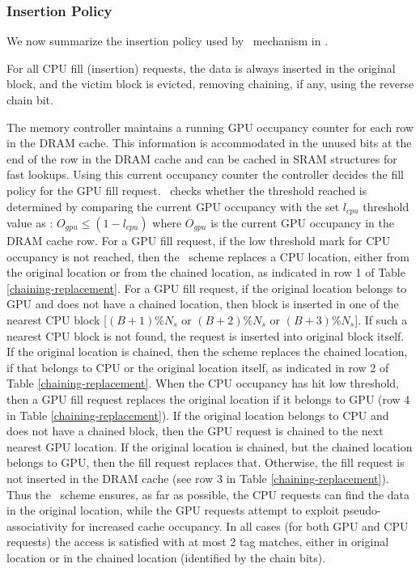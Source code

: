 \subsubsection{Insertion Policy}
\par We now summarize the insertion policy used by \chaining\ mechanism in \cachename. 
\par For all CPU fill (insertion) requests, the data is always inserted in the original block, and the victim block is evicted, removing chaining, if any, using the reverse chain bit. 
\par The memory controller maintains a running GPU occupancy counter for each row in the DRAM cache. This information is accommodated in the unused bits at the end of the row in the DRAM cache and can be cached in SRAM structures for fast lookups. Using this current occupancy counter the controller decides the fill policy for the GPU fill request. \cachename\ checks whether the threshold reached is determined by comparing the current GPU occupancy with the set \textit{$l_{cpu}$} threshold value as : $O_{gpu}\le(1-l_{cpu})$ where $O_{gpu}$ is the current GPU occupancy in the DRAM cache row. For a GPU fill request, if the low threshold mark for CPU occupancy is not reached, then the \chaining\ scheme replaces a CPU location, either from the original location or from the chained location, as indicated in row 1 of Table \ref{chaining-replacement}. For a GPU fill request, if the original location belongs to GPU and does not have a chained location, then block is inserted in one of the nearest CPU block [$(B+1)\%N_s$ or $(B+2)\%N_s$ or $(B+3)\%N_s$]. If such a nearest CPU block is not found, the request is inserted into original block itself. If the original location is chained, then the scheme replaces the chained location, if that belongs to CPU or the original location itself, as indicated in row 2 of Table \ref{chaining-replacement}. When the CPU occupancy has hit low threshold, then a GPU fill request replaces the original location if it belongs to GPU (row 4 in Table \ref{chaining-replacement}). If the original location belongs to CPU and does not have a chained block, then the GPU request is chained to the next nearest GPU location. If the original location is chained, but the chained location belongs to GPU, then the fill request replaces that. Otherwise, the fill request is not inserted in the DRAM cache (see row 3 in Table \ref{chaining-replacement}). Thus the \chaining\ scheme ensures, as far as possible, the CPU requests can find the data in the original location, while the GPU requests attempt to exploit pseudo-associativity for increased cache occupancy. In all cases (for both GPU and CPU requests) the access is satisfied with at most 2 tag matches, either in original location or in the chained location (identified by the chain bits). 

